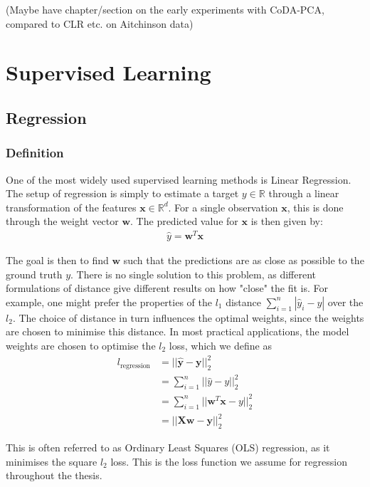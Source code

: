  

(Maybe have chapter/section on the early experiments with CoDA-PCA, compared to CLR etc. on Aitchinson data)


\section{Supervised Learning}
\label{sec:sup}


\subsection{Regression}
\subsubsection{Definition}
One of the most widely used supervised learning methods is Linear Regression. The setup of regression is simply to estimate a target $y \in \mathbb{R}$ through a linear transformation of the features $\mathbf{x} \in \mathbb{R}^{d}$. For a single observation $\mathbf{x}$, this is done through the weight vector $\mathbf{w}$. The predicted value for $\mathbf{x}$ is then given by:
\begin{align}
    \hat{y} = \mathbf{w}^T\mathbf{x}
\end{align}

The goal is then to find $\mathbf{w}$ such that the predictions are as close as possible to the ground truth $y$. There is no single solution to this problem, as different formulations of distance give different results on how "close" the fit is. For example, one might prefer the properties of the $l_1$ distance $\sum_{i=1}^n|\hat{y}_i - y|$ over the $l_2$. The choice of distance in turn influences the optimal weights, since the weights are chosen to minimise this distance. In most practical applications, the model weights are chosen to optimise the $l_2$ loss, which we define as
\begin{align}
    l_{\mathrm{regression}} &= ||\mathbf{\hat{y}} - \mathbf{y}||_2^2 \\
    &= \sum_{i=1}^n  ||\hat{y} - y||_2^2 \\
     &= \sum_{i=1}^n  ||\mathbf{w}^T\mathbf{x} - y||_2^2 \\
    &= ||\mathbf{X}\mathbf{w} - \mathbf{y}||_2^2 
    \label{regressionloss}
\end{align}

This is often referred to as Ordinary Least Squares (OLS) regression, as it minimises the square $l_2$ loss. This is the loss function we assume for regression throughout the thesis.


